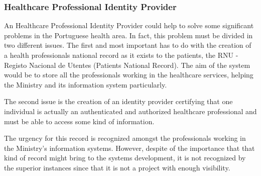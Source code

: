 
\subsubsection{Healthcare Professional Identity Provider}

An Healthcare Professional Identity Provider could help to solve some significant problems in the Portuguese health area. In fact, this problem must be divided in two different issues. The first and most important has to do with the creation of a health professionals national record as it exists to the patients, the RNU - Registo Nacional de Utentes (Patients National Record). The aim of the system would be to store all the professionals working in the healthcare services, helping the Ministry and its information system particularly.

The second issue is the creation of an identity provider certifying that one individual is actually an authenticated and authorized healthcare professional and must be able to access some kind of information.

The urgency for this record is recognized amongst the professionals working in the Ministry's information systems. However, despite of the importance that that kind of record might bring to the systems development, it is not recognized by the superior instances since that it is not a project with enough visibility.


